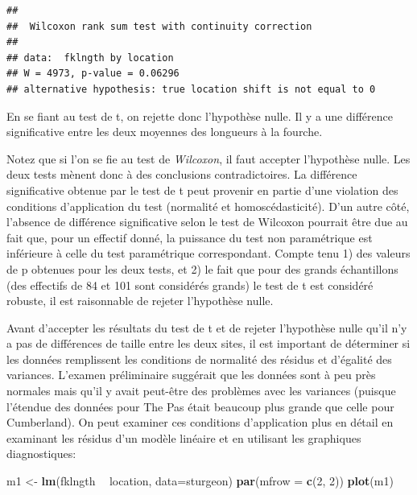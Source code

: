 \documentclass[12pt,]{book}
\newenvironment{Shaded}{\begin{snugshade}}{\end{snugshade}}
\newcommand{\DataTypeTok}[1]{\textcolor[rgb]{0.27,0.27,0.27}{#1}}
\newcommand{\DecValTok}[1]{\textcolor[rgb]{0.06,0.06,0.06}{#1}}
\newcommand{\KeywordTok}[1]{\textcolor[rgb]{0.27,0.27,0.27}{\textbf{#1}}}
\newcommand{\NormalTok}[1]{#1}
\newcommand{\OperatorTok}[1]{\textcolor[rgb]{0.43,0.43,0.43}{\textbf{#1}}}
\newcommand{\StringTok}[1]{\textcolor[rgb]{0.5,0.5,0.5}{#1}}
\begin{document}
\begin{verbatim}
## 
## 	Wilcoxon rank sum test with continuity correction
## 
## data:  fklngth by location
## W = 4973, p-value = 0.06296
## alternative hypothesis: true location shift is not equal to 0
\end{verbatim}

En se fiant au test de t, on rejette donc l'hypothèse nulle. Il y a une différence significative entre les deux moyennes des longueurs à la fourche.

Notez que si l'on se fie au test de \emph{Wilcoxon}, il faut accepter l'hypothèse nulle. Les deux tests mènent donc à des conclusions contradictoires. La différence significative obtenue par le test de t peut provenir en partie d'une violation des conditions d'application du test (normalité et homoscédasticité). D'un autre côté, l'absence de différence significative selon le test de Wilcoxon pourrait être due au fait que, pour un effectif donné, la puissance du test non paramétrique est inférieure à celle du test paramétrique correspondant. Compte tenu 1) des valeurs de p obtenues pour les deux tests, et 2) le fait que pour des grands échantillons (des effectifs de 84 et 101 sont considérés grands) le test de t est considéré robuste, il est raisonnable de rejeter l'hypothèse nulle.

Avant d'accepter les résultats du test de t et de rejeter l'hypothèse nulle qu'il n'y a pas de différences de taille entre les deux sites, il est important de déterminer si les données remplissent les conditions de normalité des résidus et d'égalité des variances. L'examen préliminaire suggérait que les données sont à peu près normales mais qu'il y avait peut-être des problèmes avec les variances (puisque l'étendue des données pour The Pas était beaucoup plus grande que celle pour Cumberland). On peut examiner ces conditions d'application plus en détail en examinant les résidus d'un modèle linéaire et en utilisant les graphiques diagnostiques:

\begin{Shaded}
\begin{Highlighting}[]
\NormalTok{m1 <-}\StringTok{ }\KeywordTok{lm}\NormalTok{(fklngth }\OperatorTok{~}\StringTok{ }\NormalTok{location, }\DataTypeTok{data=}\NormalTok{sturgeon)}
\KeywordTok{par}\NormalTok{(}\DataTypeTok{mfrow =} \KeywordTok{c}\NormalTok{(}\DecValTok{2}\NormalTok{, }\DecValTok{2}\NormalTok{))}
\KeywordTok{plot}\NormalTok{(m1)}
\end{Highlighting}
\end{Shaded}
\end{document}
